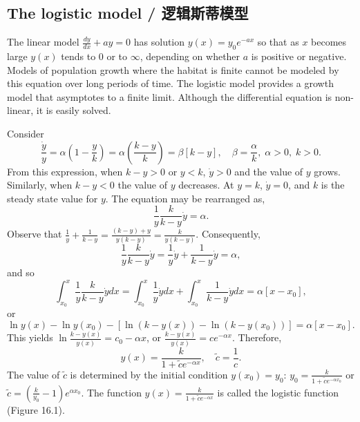 \subsection{The logistic model / 逻辑斯蒂模型}

\begin{original}
The linear model $\frac{dy}{dx} + ay = 0$ has solution $y(x) = y_0 e^{-ax}$ so that as $x$ becomes large $y(x)$ tends to $0$ or to $\infty$, depending on whether $a$ is positive or negative. Models of population growth where the habitat is finite cannot be modeled by this equation over long periods of time. The logistic model provides a growth model that asymptotes to a finite limit. Although the differential equation is non-linear, it is easily solved.

Consider
\[
\frac{\dot{y}}{y} = \alpha\left(1 - \frac{y}{k}\right) = \alpha\left(\frac{k - y}{k}\right) = \beta[k - y], \quad \beta = \frac{\alpha}{k}, \;\alpha > 0,\; k > 0.
\]
From this expression, when $k - y > 0$ or $y < k$, $\dot{y} > 0$ and the value of $y$ grows. Similarly, when $k - y < 0$ the value of $y$ decreases. At $y = k$, $\dot{y} = 0$, and $k$ is the steady state value for $y$. The equation may be rearranged as,
\[
\frac{1}{y}\frac{k}{k - y}\dot{y} = \alpha.
\]
Observe that $\frac{1}{y} + \frac{1}{k - y} = \frac{(k - y) + y}{y(k - y)} = \frac{k}{y(k - y)}$. Consequently,
\[
\frac{1}{y}\frac{k}{k - y}\dot{y} = \frac{1}{y}\dot{y} + \frac{1}{k - y}\dot{y} = \alpha,
\]
and so
\[
\int_{x_0}^{x} \frac{1}{y}\frac{k}{k - y}\dot{y}dx = \int_{x_0}^{x} \frac{1}{y}\dot{y}dx + \int_{x_0}^{x} \frac{1}{k - y}\dot{y}dx = \alpha[x - x_0],
\]
or
\[
\ln y(x) - \ln y(x_0) - [\ln(k - y(x)) - \ln(k - y(x_0))] = \alpha[x - x_0].
\]
This yields $\ln\frac{k - y(x)}{y(x)} = c_0 - \alpha x$, or $\frac{k - y(x)}{y(x)} = c e^{-\alpha x}$. Therefore,
\[
y(x) = \frac{k}{1 + \tilde{c} e^{-\alpha x}}, \quad \tilde{c} = \frac{1}{c}.
\]
The value of $\tilde{c}$ is determined by the initial condition $y(x_0) = y_0$: $y_0 = \frac{k}{1 + \tilde{c} e^{-\alpha x_0}}$ or $\tilde{c} = \left(\frac{k}{y_0} - 1\right) e^{\alpha x_0}$. The function $y(x) = \frac{k}{1 + \tilde{c} e^{-\alpha x}}$ is called the logistic function (Figure 16.1).
\end{original}
